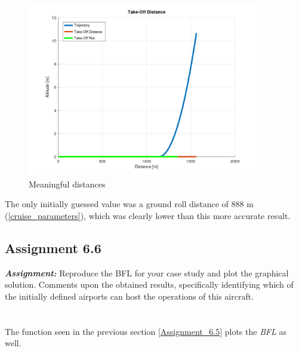 \documentclass{article}
\begin{document}
\begin{figure}[h!]
    \centering
    \includegraphics[width=0.9\textwidth]{Sources/Plots_and_Pictures/Distances.png}
    \caption{Meaningful distances}
    \label{distances}
\end{figure}

The only initially guessed value was a ground roll distance of 888 m (\ref{cruise_parameters}), which was clearly lower than this more accurate result. 



\clearpage






\subsection{Assignment 6.6\label{Assignment_6.6}}

\textbf{\textit{Assignment:}} Reproduce the BFL for your case study and plot the graphical solution. 
Comments upon the obtained results, specifically identifying which of the initially 
defined airports can host the operations of this aircraft. \\ \\ \\ 

The function seen in the previous section \ref{Assignment_6.5} plots the \textit{BFL} as well. \\ 
\end{document}
